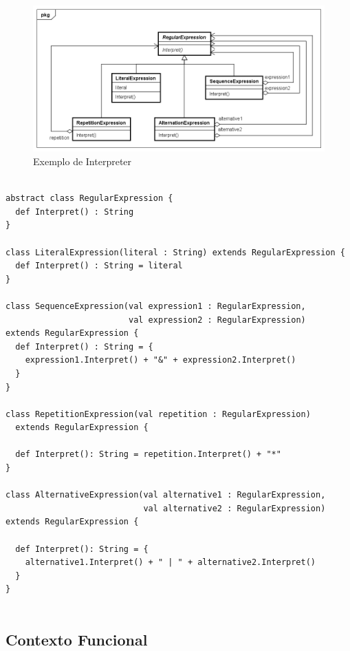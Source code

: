 \begin{figure}[htb]
	\caption{\label{interpreter_exemplo}Exemplo de Interpreter}
	\begin{center}
	    \includegraphics[scale=0.5]{5_padroes-contexto-funcional/5.3_comportamentais/5.3.03_interpreter/Interpreter_exemplo.png}
	\end{center}
\end{figure}

\begin{lstlisting}[caption={Interpreter Orientação a Objetos},label=oointerpreter]

abstract class RegularExpression {
  def Interpret() : String
}

class LiteralExpression(literal : String) extends RegularExpression {
  def Interpret() : String = literal
}

class SequenceExpression(val expression1 : RegularExpression,
                         val expression2 : RegularExpression)
extends RegularExpression {
  def Interpret() : String = {
    expression1.Interpret() + "&" + expression2.Interpret()
  }
}

class RepetitionExpression(val repetition : RegularExpression)
  extends RegularExpression {

  def Interpret(): String = repetition.Interpret() + "*"
}

class AlternativeExpression(val alternative1 : RegularExpression,
                            val alternative2 : RegularExpression)
extends RegularExpression {

  def Interpret(): String = {
    alternative1.Interpret() + " | " + alternative2.Interpret()
  }
}
    
\end{lstlisting}

\subsection*{Contexto Funcional}


